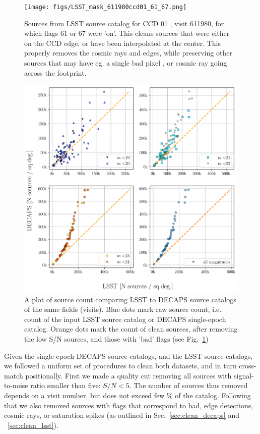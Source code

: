 \documentclass[DM,lsstdraft,toc,usenatbib]{lsstdoc}
\begin{document}
\begin{figure}
\texttt{[image: figs/LSST\_mask\_611980ccd01\_61\_67.png]}
\caption{Sources from LSST source catalog for CCD 01 , visit 611980,  for which flags 61 or 67 were 'on'. This cleans sources that were either on the CCD edge, or have been interpolated at the center. This properly removes the cosmic rays and edges, while preserving other sources that may have eg. a single bad pixel , or cosmic ray going across the footprint. }
\label{fig:lsst_src_flags}
\end{figure} 



\begin{figure}
\begin{centering}
\includegraphics[width=0.6\columnwidth]{figs/decaps_lsst_source_count.png}
\caption{A plot of source count comparing LSST to DECAPS source catalogs of the same fields (visits). Blue dots mark raw source count, i.e. count of the input LSST  source catalog or DECAPS single-epoch catalog.  Orange dots mark the count of clean sources, after removing the low S/N sources,  and those with 'bad' flags (see Fig.~\ref{fig:lsst_src_flags})}
\label{fig:lsst_count_comparison}
\end{centering}
\end{figure} 


Given the single-epoch DECAPS source catalogs, and the LSST source catalogs, we followed a uniform set of procedures to clean both datasets, and in turn cross-match positionally. First we made a quality cut removing all sources with signal-to-noise ratio smaller than five:  $S/N < 5$. The number of sources thus removed depends on a visit number, but does not exceed few \% of the catalog. Following that we also removed sources with flags that correspond to bad, edge detections, cosmic rays, or saturation spikes (as outlined in Sec.~\ref{sec:clean_decaps} and ~\ref{sec:clean_lsst}). 
\end{document}
